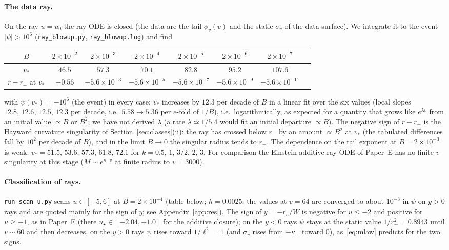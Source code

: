 \documentclass[11pt]{article}
\begin{document}
\paragraph{The data ray.} On the ray $u=u_0$ the ray ODE is closed (the data are the tail $\phi_v(v)$ and the static $\sigma_v$ of the data surface). We integrate it to the event $|\psi|>10^{6}$ (\texttt{ray\_blowup.py}, \texttt{ray\_blowup.log}) and find
\begin{center}\small
\begin{tabular}{cccccccc}
\toprule
$B$ & $2\!\times\!10^{-2}$ & $2\!\times\!10^{-3}$ & $2\!\times\!10^{-4}$ & $2\!\times\!10^{-5}$ & $2\!\times\!10^{-6}$ & $2\!\times\!10^{-7}$\\\midrule
$v_*$ & $46.5$ & $57.3$ & $70.1$ & $82.8$ & $95.2$ & $107.6$\\
$r-r_-$ at $v_*$ & $-0.56$ & $-5.6\!\times\!10^{-3}$ & $-5.6\!\times\!10^{-5}$ & $-5.6\!\times\!10^{-7}$ & $-5.6\!\times\!10^{-9}$ & $-5.6\!\times\!10^{-11}$\\\bottomrule
\end{tabular}
\end{center}
with $\psi(v_*)=-10^{6}$ (the event) in every case: $v_*$ increases by $12.3$ per decade of $B$ in a linear fit over the six values (local slopes $12.8,\,12.6,\,12.5,\,12.3$ per decade, i.e.\ $5.58\to5.36$ per $e$-fold of $1/B$), i.e.\ logarithmically, as expected for a quantity that grows like $e^{\lambda v}$ from an initial value $\propto B$ or $B^{2}$; we have not derived $\lambda$ (a rate $\lambda\simeq1/5.4$ would fit an initial departure $\propto B$). The negative sign of $r-r_-$ is the Hayward curvature singularity of Section~\ref{sec:classes}(ii): the ray has crossed below $r_-$ by an amount $\propto B^{2}$ at $v_*$ (the tabulated differences fall by $10^{2}$ per decade of $B$), and in the limit $B\to0$ the singular radius tends to $r_-$. The dependence on the tail exponent at $B=2\times10^{-3}$ is weak: $v_*=51.5,\,53.6,\,57.3,\,61.8,\,72.1$ for $k=0.5,\,1,\,3/2,\,2,\,3$. For comparison the Einstein-additive ray ODE of Paper~E has no finite-$v$ singularity at this stage ($M\sim e^{\kappa_-v}$ at finite radius to $v=3000$).

\paragraph{Classification of rays.} \texttt{run\_scan\_u.py} scans $u\in[-5,6]$ at $B=2\times10^{-4}$ (table below; $h=0.0025$; the values at $v=64$ are converged to about $10^{-3}$ in $\psi$ on $y>0$ rays and are quoted mainly for the sign of $y$; see Appendix~\ref{app:res}). The sign of $y=-r_u/W$ is negative for $u\le-2$ and positive for $u\ge-1$, as in Paper~E (there $u_\star\in[-2.04,-1.0]$ for the additive closure); on the $y<0$ rays $\psi$ stays at the static value $1/r_-^{2}=0.8943$ until $v\sim60$ and then decreases, on the $y>0$ rays $\psi$ rises toward $1/\ell^{2}=1$ (and $\sigma_v$ rises from $-\kappa_-$ toward $0$), as~\eqref{eq:mlaw} predicts for the two signs.
\end{document}
